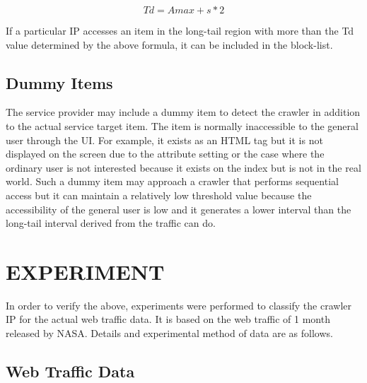   \begin{displaymath}
    Td = Amax + s * 2
  \end{displaymath}

If a particular IP accesses an item in the long-tail region with more than the Td value determined by the above formula, it can be included in the block-list.

\subsection{Dummy Items}
The service provider may include a dummy item to detect the crawler in addition to the actual service target item. The item is normally inaccessible to the general user through the UI. For example, it exists as an HTML tag but it is not displayed on the screen due to the attribute setting or the case where the ordinary user is not interested because it exists on the index but is not in the real world.
Such a dummy item may approach a crawler that performs sequential access but it can maintain a relatively low threshold value because the accessibility of the general user is low and it generates a lower interval than the long-tail interval derived from the traffic can do.



%
%
\section{EXPERIMENT}
In order to verify the above, experiments were performed to classify the crawler IP for the actual web traffic data. It is based on the web traffic of 1 month released by NASA. Details and experimental method of data are as follows.


\subsection{Web Traffic Data}


